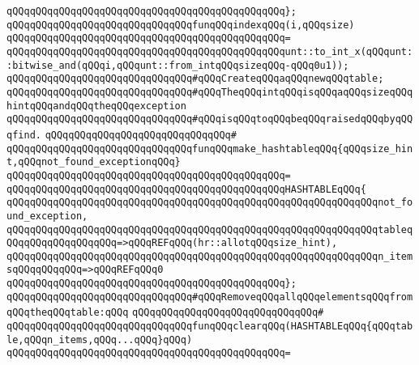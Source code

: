 \verb|qQQqqQQqqQQqqQQqqQQqqQQqqQQqqQQqqQQqqQQqqQQqqQQq};|\newline
\newline
\verb|qQQqqQQqqQQqqQQqqQQqqQQqqQQqqQQqfunqQQqindexqQQq(i,qQQqsize)|\newline
\verb|qQQqqQQqqQQqqQQqqQQqqQQqqQQqqQQqqQQqqQQqqQQqqQQq=|\newline
\verb|qQQqqQQqqQQqqQQqqQQqqQQqqQQqqQQqqQQqqQQqqQQqqQQqunt::to_int_x(qQQqunt::bitwise_and(qQQqi,qQQqunt::from_intqQQqsizeqQQq-qQQq0u1));|\newline
\newline
\verb|qQQqqQQqqQQqqQQqqQQqqQQqqQQqqQQq#qQQqCreateqQQqaqQQqnewqQQqtable;|\newline
\verb|qQQqqQQqqQQqqQQqqQQqqQQqqQQqqQQq#qQQqTheqQQqintqQQqisqQQqaqQQqsizeqQQqhintqQQqandqQQqtheqQQqexception|\newline
\verb|qQQqqQQqqQQqqQQqqQQqqQQqqQQqqQQq#qQQqisqQQqtoqQQqbeqQQqraisedqQQqbyqQQqfind.|\newline
\verb|qQQqqQQqqQQqqQQqqQQqqQQqqQQqqQQq#|\newline
\verb|qQQqqQQqqQQqqQQqqQQqqQQqqQQqqQQqfunqQQqmake_hashtableqQQq{qQQqsize_hint,qQQqnot_found_exceptionqQQq}|\newline
\verb|qQQqqQQqqQQqqQQqqQQqqQQqqQQqqQQqqQQqqQQqqQQqqQQq=|\newline
\verb|qQQqqQQqqQQqqQQqqQQqqQQqqQQqqQQqqQQqqQQqqQQqqQQqHASHTABLEqQQq{|\newline
\verb|qQQqqQQqqQQqqQQqqQQqqQQqqQQqqQQqqQQqqQQqqQQqqQQqqQQqqQQqqQQqqQQqnot_found_exception,|\newline
\verb|qQQqqQQqqQQqqQQqqQQqqQQqqQQqqQQqqQQqqQQqqQQqqQQqqQQqqQQqqQQqqQQqtableqQQqqQQqqQQqqQQqqQQq=>qQQqREFqQQq(hr::allotqQQqsize_hint),|\newline
\verb|qQQqqQQqqQQqqQQqqQQqqQQqqQQqqQQqqQQqqQQqqQQqqQQqqQQqqQQqqQQqqQQqn_itemsqQQqqQQqqQQq=>qQQqREFqQQq0|\newline
\verb|qQQqqQQqqQQqqQQqqQQqqQQqqQQqqQQqqQQqqQQqqQQqqQQq};|\newline
\newline
\verb|qQQqqQQqqQQqqQQqqQQqqQQqqQQqqQQq#qQQqRemoveqQQqallqQQqelementsqQQqfromqQQqtheqQQqtable:qQQq|\newline
\verb|qQQqqQQqqQQqqQQqqQQqqQQqqQQqqQQq#|\newline
\verb|qQQqqQQqqQQqqQQqqQQqqQQqqQQqqQQqfunqQQqclearqQQq(HASHTABLEqQQq{qQQqtable,qQQqn_items,qQQq...qQQq}qQQq)|\newline
\verb|qQQqqQQqqQQqqQQqqQQqqQQqqQQqqQQqqQQqqQQqqQQqqQQq=|\newline
